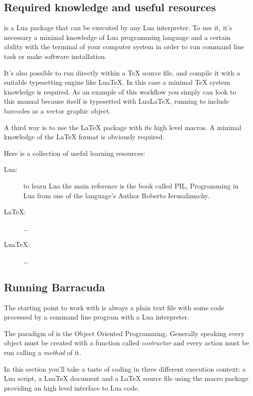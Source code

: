 \documentclass[11pt,a4paper]{article}
\begin{document}
\subsection{Required knowledge and useful resources}

\brcd{} is a Lua package that can be executed by any Lua interpreter. To use it,
it's necessary a minimal knowledge of Lua programming language and a certain
ability with the terminal of your computer system in order to run command line
task or make software installation.

It's also possible to run \brcd{} directly within a \TeX{} source file, and
compile it with a suitable typesetting engine like Lua\TeX{}. In this case a
minimal \TeX{} system knowledge is required. As an example of this workflow you
simply can look to this manual because itself is typesetted with LuaLa\TeX{},
running \brcd{} to include barcodes as a vector graphic object.

A third way is to use the \LaTeX{} package  with its high
level macros. A minimal knowledge of the \LaTeX{} format is obviously required.

Here is a collection of useful learning resources:
\begin{description}
\item[Lua:] to learn Lua the main reference is the book called PIL, Programming
in Lua from one of the language's Author Roberto Ierusalimschy.
\item[\LaTeX:] \dots
\item[Lua\TeX:] \dots
\end{description}


\subsection{Running Barracuda}
\label{secEnter}

The starting point to work with \brcd{} is always a plain text file with some
code processed by a command line program with a Lua interpreter.

The paradigm of \brcd{} is the Object Oriented Programming. Generally speaking
every object must be created with a function called \emph{costructor} and every
action must be run calling a \emph{method} of it.

In this section you'll take a taste of \brcd{} coding in three different
execution context: a Lua script, a Lua\TeX{} document and a \LaTeX{} source file
using the macro package  providing an high level interface
to Lua code.
\end{document}

